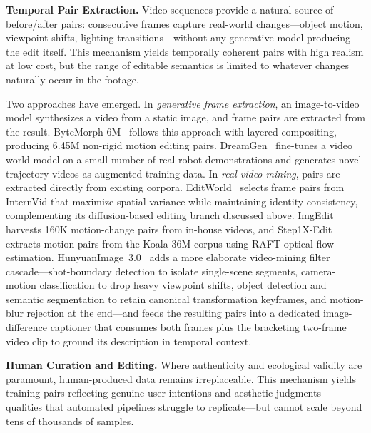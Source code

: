 \textbf{Temporal Pair Extraction.}
Video sequences provide a natural source of before/after pairs: consecutive frames capture real-world changes---object motion, viewpoint shifts, lighting transitions---without any generative model producing the edit itself. This mechanism yields temporally coherent pairs with high realism at low cost, but the range of editable semantics is limited to whatever changes naturally occur in the footage.

Two approaches have emerged. In \emph{generative frame extraction}, an image-to-video model synthesizes a video from a static image, and frame pairs are extracted from the result. ByteMorph-6M~\citep{chang2025bytemorph} follows this approach with layered compositing, producing 6.45M non-rigid motion editing pairs. DreamGen~\citep{jang2025dreamgen} fine-tunes a video world model on a small number of real robot demonstrations and generates novel trajectory videos as augmented training data. In \emph{real-video mining}, pairs are extracted directly from existing corpora. EditWorld~\citep{zeng2025editworld} selects frame pairs from InternVid that maximize spatial variance while maintaining identity consistency, complementing its diffusion-based editing branch discussed above. ImgEdit~\citep{ye2025imgedit} harvests 160K motion-change pairs from in-house videos, and Step1X-Edit~\citep{liu2025step1x} extracts motion pairs from the Koala-36M corpus using RAFT optical flow estimation. HunyuanImage~3.0~\citep{cao2025hunyuanimage} adds a more elaborate video-mining filter cascade---shot-boundary detection to isolate single-scene segments, camera-motion classification to drop heavy viewpoint shifts, object detection and semantic segmentation to retain canonical transformation keyframes, and motion-blur rejection at the end---and feeds the resulting pairs into a dedicated image-difference captioner that consumes both frames plus the bracketing two-frame video clip to ground its description in temporal context.

\textbf{Human Curation and Editing.}
Where authenticity and ecological validity are paramount, human-produced data remains irreplaceable. This mechanism yields training pairs reflecting genuine user intentions and aesthetic judgments---qualities that automated pipelines struggle to replicate---but cannot scale beyond tens of thousands of samples.

